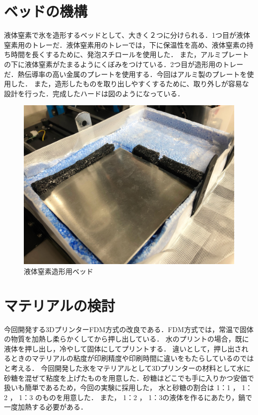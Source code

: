 \section{ベッドの機構}
\label{sec:paragraph}
液体窒素で氷を造形するベッドとして、大きく２つに分けられる．1つ目が液体窒素用のトレーだ．液体窒素用のトレーでは，下に保温性を高め、液体窒素の持ち時間を長くするために、発泡スチロールを使用した．
また，アルミプレートの下に液体窒素がたまるようにくぼみをつけている．2つ目が造形用のトレーだ．熱伝導率の高い金属のプレートを使用する．今回はアルミ製のプレートを使用した．
また，造形したものを取り出しやすくするために、取り外しが容易な設計を行った．完成したハードは図のようになっている．

\begin{figure}[H]
  \centering
  \includegraphics[width=7truecm]{./fig/stage.jpg}
  \caption{液体窒素造形用ベッド}
  \label{fig:stage}
\end{figure}

\section{マテリアルの検討}
\label{sec:paragraph}
今回開発する3DプリンターFDM方式の改良である．FDM方式では，常温で固体の物質を加熱し柔らかくしてから押し出している．
水のプリントの場合，既に液体を押し出し，冷やして固体にしてプリントする．
違いとして，押し出されるときのマテリアルの粘度が印刷精度や印刷時間に違いをもたらしているのではと考える．
今回開発した氷をマテリアルとして3Dプリンターの材料として水に砂糖を混ぜて粘度を上げたものを用意した．砂糖はどこでも手に入りかつ安価で扱いも簡単であるため，今回の実験に採用した，
水と砂糖の割合は 1：1 ， 1：2 ， 1：3 のものを用意した．
また， 1：2 ， 1：3の液体を作るにあたり，鍋で一度加熱する必要がある．



